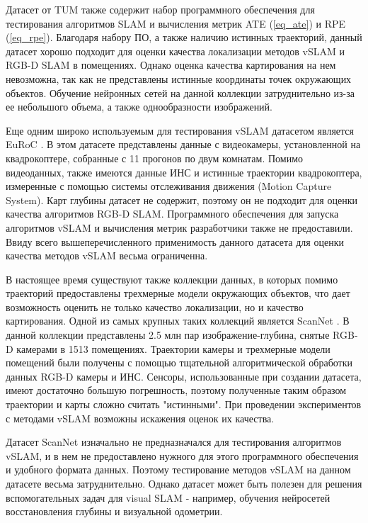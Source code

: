 \documentclass{mipt-thesis-ms}
\begin{document}
	Датасет от TUM также содержит набор программного обеспечения для тестирования алгоритмов SLAM и вычисления метрик ATE (\ref{eq_ate}) и RPE (\ref{eq_rpe}). Благодаря набору ПО, а также наличию истинных траекторий, данный датасет хорошо подходит для оценки качества локализации методов vSLAM и RGB-D SLAM в помещениях. Однако оценка качества картирования на нем невозможна, так как не представлены истинные координаты точек окружающих объектов. Обучение нейронных сетей на данной коллекции затруднительно из-за ее небольшого объема, а также однообразности изображений.
	
	Еще одним широко используемым для тестирования vSLAM датасетом является EuRoC \cite{burri2016euroc}. В этом датасете представлены данные с видеокамеры, установленной на квадрокоптере, собранные с 11 прогонов по двум комнатам. Помимо видеоданных, также имеются данные ИНС и истинные траектории квадрокоптера, измеренные с помощью системы отслеживания движения (Motion Capture System). Карт глубины датасет не содержит, поэтому он не подходит для оценки качества алгоритмов RGB-D SLAM. Программного обеспечения для запуска алгоритмов vSLAM и вычисления метрик разработчики также не предоставили. Ввиду всего вышеперечисленного применимость данного датасета для оценки качества методов vSLAM весьма ограниченна.
	
	В настоящее время существуют также коллекции данных, в которых помимо траекторий предоставлены трехмерные модели окружающих объектов, что дает возможность оценить не только качество локализации, но и качество картирования. Одной из самых крупных таких коллекций является ScanNet \cite{dai2017scannet}. В данной коллекции представлены 2.5 млн пар изображение-глубина, снятые RGB-D камерами в 1513 помещениях. Траектории камеры и трехмерные модели помещений были получены с помощью тщательной алгоритмической обработки данных RGB-D камеры и ИНС. Сенсоры, использованные при создании датасета, имеют достаточно большую погрешность, поэтому полученные таким образом траектории и карты сложно считать "истинными". При проведении экспериментов с методами vSLAM возможны искажения оценок их качества.
	
	Датасет ScanNet изначально не предназначался для тестирования алгоритмов vSLAM, и в нем не предоставлено нужного для этого программного обеспечения и удобного формата данных. Поэтому тестирование методов vSLAM на данном датасете весьма затруднительно. Однако датасет может быть полезен для решения вспомогательных задач для visual SLAM - например, обучения нейросетей восстановления глубины и визуальной одометрии.
	
\end{document}
